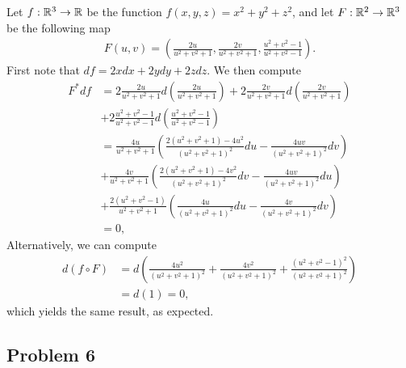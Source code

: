 \documentclass{../../mathnotes}
\begin{document}
Let $f:\mathbb{R}^3\to\mathbb{R}$ be the function $f(x,y,z)=x^2+y^2+z^2$, and let $F:\mathbb{R}^2\to\mathbb{R}^3$ be the following map
\begin{align*}
    F(u,v)=\left( \frac{2u}{u^2+v^2+1},\frac{2v}{u^2+v^2+1}, \frac{u^2+v^2-1}{u^2+v^2-1} \right).
\end{align*}
First note that $df=2xdx+2ydy+2zdz$.
We then compute
\begin{align*}
    F^*df&=2\frac{2u}{u^2+v^2+1}d(\frac{2u}{u^2+v^2+1})+2\frac{2v}{u^2+v^2+1}d(\frac{2v}{u^2+v^2+1})\\
    &+2\frac{u^2+v^2-1}{u^2+v^2-1}d(\frac{u^2+v^2-1}{u^2+v^2-1})\\
    &=\frac{4u}{u^2+v^2+1}\left( \frac{2(u^2+v^2+1)-4u^2}{(u^2+v^2+1)^2}du-\frac{4uv}{(u^2+v^2+1)^2}dv \right)\\
    &+\frac{4v}{u^2+v^2+1}\left( \frac{2(u^2+v^2+1)-4v^2}{(u^2+v^2+1)^2}dv-\frac{4uv}{(u^2+v^2+1)^2}du \right)\\
    &+\frac{2(u^2+v^2-1)}{u^2+v^2+1}\left(\frac{4u}{(u^2+v^2+1)^2}du-\frac{4v}{(u^2+v^2+1)^2}dv \right)\\
    &=0,
\end{align*}
Alternatively, we can compute
\begin{align*}
    d(f\circ F)&=d\left(\frac{4u^2}{(u^2+v^2+1)^2}+\frac{4v^2}{(u^2+v^2+1)^2}+\frac{(u^2+v^2-1)^2}{(u^2+v^2+1)^2}\right)\\
    &=d(1)=0,
\end{align*}
which yields the same result, as expected.

\subsection*{Problem 6}
\end{document}
